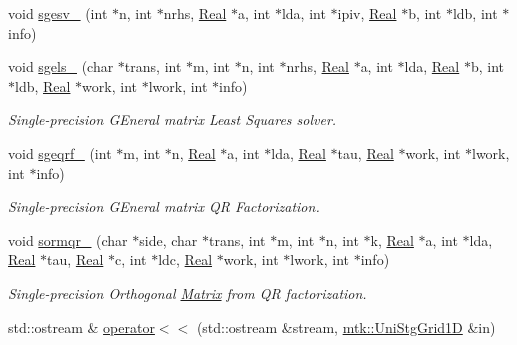 \begin{DoxyCompactItemize}
\item 
void \hyperlink{namespacemtk_ae1d63c7ae73b3c48e0dca81eb19039f3}{sgesv\-\_\-} (int $\ast$n, int $\ast$nrhs, \hyperlink{group__c01-roots_gac080bbbf5cbb5502c9f00405f894857d}{Real} $\ast$a, int $\ast$lda, int $\ast$ipiv, \hyperlink{group__c01-roots_gac080bbbf5cbb5502c9f00405f894857d}{Real} $\ast$b, int $\ast$ldb, int $\ast$info)
\item 
void \hyperlink{namespacemtk_ada6df1b733204aa7ff0b1ec7556288f9}{sgels\-\_\-} (char $\ast$trans, int $\ast$m, int $\ast$n, int $\ast$nrhs, \hyperlink{group__c01-roots_gac080bbbf5cbb5502c9f00405f894857d}{Real} $\ast$a, int $\ast$lda, \hyperlink{group__c01-roots_gac080bbbf5cbb5502c9f00405f894857d}{Real} $\ast$b, int $\ast$ldb, \hyperlink{group__c01-roots_gac080bbbf5cbb5502c9f00405f894857d}{Real} $\ast$work, int $\ast$lwork, int $\ast$info)
\begin{DoxyCompactList}\small\item\em Single-\/precision G\-Eneral matrix Least Squares solver. \end{DoxyCompactList}\item 
void \hyperlink{namespacemtk_aece7419193d8ab43e186c97ad6d529fb}{sgeqrf\-\_\-} (int $\ast$m, int $\ast$n, \hyperlink{group__c01-roots_gac080bbbf5cbb5502c9f00405f894857d}{Real} $\ast$a, int $\ast$lda, \hyperlink{group__c01-roots_gac080bbbf5cbb5502c9f00405f894857d}{Real} $\ast$tau, \hyperlink{group__c01-roots_gac080bbbf5cbb5502c9f00405f894857d}{Real} $\ast$work, int $\ast$lwork, int $\ast$info)
\begin{DoxyCompactList}\small\item\em Single-\/precision G\-Eneral matrix Q\-R Factorization. \end{DoxyCompactList}\item 
void \hyperlink{namespacemtk_a59c58408e1c0a9837b67a417be986b82}{sormqr\-\_\-} (char $\ast$side, char $\ast$trans, int $\ast$m, int $\ast$n, int $\ast$k, \hyperlink{group__c01-roots_gac080bbbf5cbb5502c9f00405f894857d}{Real} $\ast$a, int $\ast$lda, \hyperlink{group__c01-roots_gac080bbbf5cbb5502c9f00405f894857d}{Real} $\ast$tau, \hyperlink{group__c01-roots_gac080bbbf5cbb5502c9f00405f894857d}{Real} $\ast$c, int $\ast$ldc, \hyperlink{group__c01-roots_gac080bbbf5cbb5502c9f00405f894857d}{Real} $\ast$work, int $\ast$lwork, int $\ast$info)
\begin{DoxyCompactList}\small\item\em Single-\/precision Orthogonal \hyperlink{classmtk_1_1Matrix}{Matrix} from Q\-R factorization. \end{DoxyCompactList}\item 
std\-::ostream \& \hyperlink{namespacemtk_a97f79d150b3b5c7b76d4fcc2271f972b}{operator$<$$<$} (std\-::ostream \&stream, \hyperlink{classmtk_1_1UniStgGrid1D}{mtk\-::\-Uni\-Stg\-Grid1\-D} \&in)
\end{DoxyCompactItemize}
